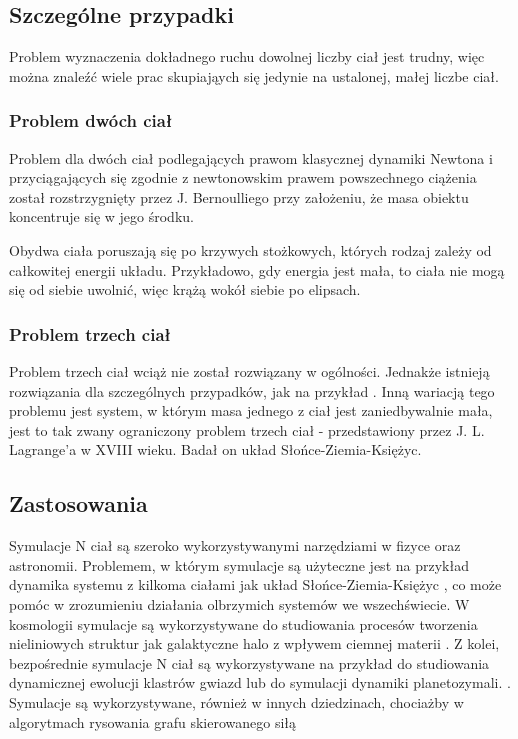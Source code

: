 \documentclass[14pt,twoside,a4paper]{article}
\begin{document}
\subsection{\Large Szczególne przypadki}
\bigskip
Problem wyznaczenia dokładnego ruchu dowolnej liczby ciał jest trudny, więc można znaleźć wiele prac skupiająych się jedynie na ustalonej, małej liczbe ciał.

\subsubsection{Problem dwóch ciał}
Problem dla dwóch ciał podlegających prawom klasycznej dynamiki Newtona i przyciągających się zgodnie z newtonowskim prawem powszechnego ciążenia został rozstrzygnięty przez J. Bernoulliego przy założeniu, że masa obiektu koncentruje się w jego środku. \cite{fund}

Obydwa ciała poruszają się po krzywych stożkowych, których rodzaj zależy od całkowitej energii układu. Przykładowo, gdy energia jest mała, to ciała nie mogą się od siebie uwolnić, więc krążą wokół siebie po elipsach.

\subsubsection{Problem trzech ciał}
Problem trzech ciał wciąż nie został rozwiązany w ogólności. Jednakże istnieją rozwiązania dla szczególnych przypadków, jak na przykład \cite{threebody1, threebody2}. Inną wariacją tego problemu jest system, w którym masa jednego z ciał jest zaniedbywalnie mała, jest to tak zwany ograniczony problem trzech ciał - przedstawiony przez J. L. Lagrange'a w XVIII wieku. Badał on układ Słońce-Ziemia-Księżyc. 


\subsection{\Large Zastosowania}
\bigskip
Symulacje N ciał są szeroko wykorzystywanymi narzędziami w fizyce oraz astronomii. Problemem, w którym symulacje są użyteczne jest na przykład dynamika systemu z kilkoma ciałami jak układ Słońce-Ziemia-Księżyc \cite{SEMmisc}, co może pomóc w zrozumieniu działania olbrzymich systemów we wszechświecie. \cite{chaosMisc}
W kosmologii symulacje są wykorzystywane do studiowania procesów tworzenia nieliniowych struktur jak galaktyczne halo z wpływem ciemnej materii \cite{haloDensity}. 
Z kolei, bezpośrednie symulacje N ciał są wykorzystywane na przykład do studiowania dynamicznej ewolucji klastrów gwiazd lub do symulacji dynamiki planetozymali. \cite{dirNBody}. Symulacje są wykorzystywane, również w innych dziedzinach, chociażby w algorytmach rysowania grafu skierowanego siłą \cite{visGraph}
\newpage
\end{document}
